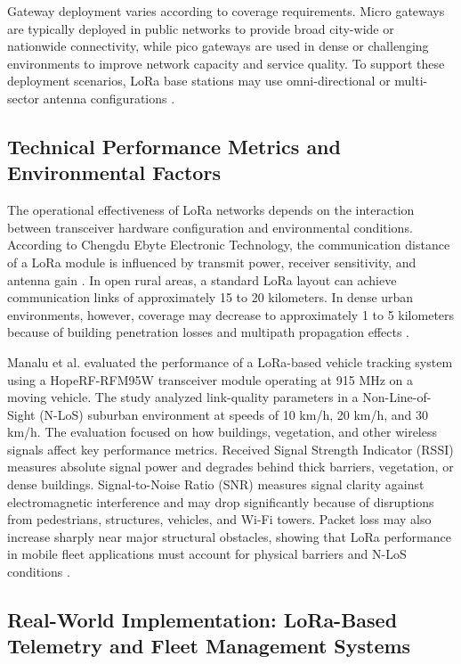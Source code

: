 Gateway deployment varies according to coverage requirements. Micro gateways are typically deployed in public networks to provide broad city-wide or nationwide connectivity, while pico gateways are used in dense or challenging environments to improve network capacity and service quality. To support these deployment scenarios, LoRa base stations may use omni-directional or multi-sector antenna configurations \cite{devalal2018lora}.

\subsection{Technical Performance Metrics and Environmental Factors}

The operational effectiveness of LoRa networks depends on the interaction between transceiver hardware configuration and environmental conditions. According to Chengdu Ebyte Electronic Technology, the communication distance of a LoRa module is influenced by transmit power, receiver sensitivity, and antenna gain \cite{ebyte2024lora_range}. In open rural areas, a standard LoRa layout can achieve communication links of approximately 15 to 20 kilometers. In dense urban environments, however, coverage may decrease to approximately 1 to 5 kilometers because of building penetration losses and multipath propagation effects \cite{ebyte2024lora_range}.

Manalu et al. \cite{manalu2023lora_performance} evaluated the performance of a LoRa-based vehicle tracking system using a HopeRF-RFM95W transceiver module operating at 915 MHz on a moving vehicle. The study analyzed link-quality parameters in a Non-Line-of-Sight (N-LoS) suburban environment at speeds of 10 km/h, 20 km/h, and 30 km/h. The evaluation focused on how buildings, vegetation, and other wireless signals affect key performance metrics. Received Signal Strength Indicator (RSSI) measures absolute signal power and degrades behind thick barriers, vegetation, or dense buildings. Signal-to-Noise Ratio (SNR) measures signal clarity against electromagnetic interference and may drop significantly because of disruptions from pedestrians, structures, vehicles, and Wi-Fi towers. Packet loss may also increase sharply near major structural obstacles, showing that LoRa performance in mobile fleet applications must account for physical barriers and N-LoS conditions \cite{manalu2023lora_performance}.

\subsection{Real-World Implementation: LoRa-Based Telemetry and Fleet Management Systems}

